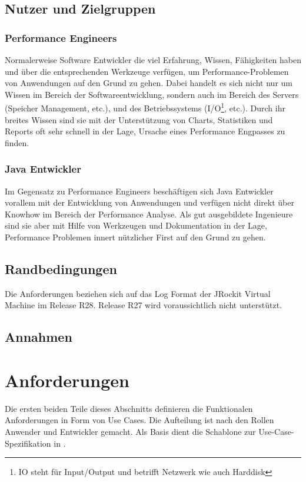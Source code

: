 \subsection{Nutzer und Zielgruppen}
\subsubsection{Performance Engineers}
Normalerweise Software Entwickler die viel Erfahrung, Wissen, Fähigkeiten haben und über die entsprechenden Werkzeuge verfügen, um Performance-Problemen von Anwendungen auf den Grund zu gehen. Dabei handelt es sich nicht nur um Wissen im Bereich der Softwareentwicklung, sondern auch im Bereich des Servers (Speicher Management, etc.), und des Betriebssystems (I/O\footnote{IO steht für Input/Output und betrifft Netzwerk wie auch Harddisk}, etc.). Durch ihr breites Wissen sind sie mit der Unterstützung von Charts, Statistiken und Reports oft sehr schnell in der Lage, Ursache eines Performance Engpasses zu finden.

\subsubsection{Java Entwickler}
Im Gegensatz zu Performance Engineers beschäftigen sich Java Entwickler vorallem mit der Entwicklung von Anwendungen und verfügen nicht direkt über Knowhow im Bereich der Performance Analyse. Als gut ausgebildete Ingenieure sind sie aber mit Hilfe von Werkzeugen und Dokumentation in der Lage, Performance Problemen innert nützlicher First auf den Grund zu gehen.

\subsection{Randbedingungen}\label{randbedingungen}
Die Anforderungen beziehen sich auf das Log Format der JRockit Virtual Machine im Release R28. Release R27 wird voraussichtlich nicht unterstützt.
\subsection{Annahmen}


\section{Anforderungen}
Die ersten beiden Teile dieses Abschnitts definieren die Funktionalen Anforderungen in Form von Use Cases. Die Aufteilung ist nach den Rollen Anwender und Entwickler gemacht. Als Basis dient die Schablone zur Use-Case-Spezifikation in \cite[S. 78-79]{pohl2010basiswissen}.





